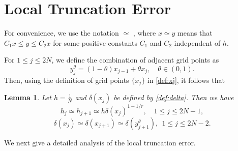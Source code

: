 \documentclass{amsart}
\newtheorem{lemma}[theorem]{Lemma}
\theoremstyle{definition}
\theoremstyle{remark}
\numberwithin{equation}{section}
\begin{document}
\section{Local Truncation Error}
\label{sec:proof-truncation-error}
For  convenience, we use the notation \( \simeq \)  ,
where \(x \simeq y\) 
means that \(C_1 x \le y \le C_2 x\) 
for some positive constants \(C_1\) and \(C_2\) independent of \(h\).


For \(1\le j \le 2N\), we define the combination of adjacent grid points as
\begin{equation} \label{def:yjt}
  y_j^\theta = (1-\theta)x_{j-1} + \theta x_{j}, \quad \theta \in (0,1).
\end{equation}
Then, using the definition of grid points $\{x_j\}$ in \eqref{def:xj}, it follows that
\begin{lemma} \label{lmm:hilexi}
  Let $h=\frac{1}{N}$ and \(\delta(x_j)\) be defined by \eqref{def:delta}.
  Then we have
  \begin{equation*}
    h_j \simeq  h_{j+1} \simeq  h \delta(x_j)^{1-1/r}, \quad 1\le j \le 2N-1 ,
  \end{equation*}
  \[
    \delta(x_j) \simeq \delta(x_{j+1}) \simeq \delta(y_{j+1}^\theta),\;\, 1\le j \le 2N-2  .
  \]
\end{lemma}



We next give a detailed analysis of the local truncation error.
\end{document}
